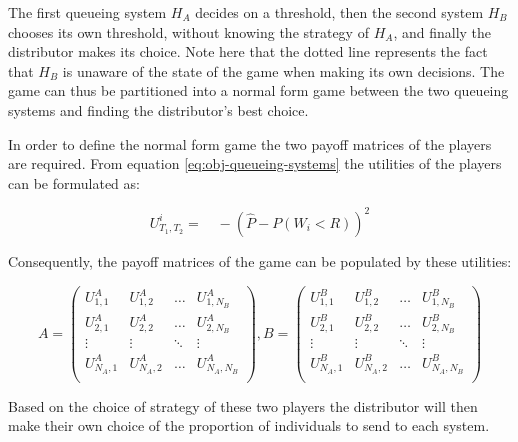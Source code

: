 The first 
queueing system \(H_A\) decides on a threshold, then the second system \(H_B\)
chooses its own threshold, without knowing the strategy of \(H_A\), and finally
the distributor makes its choice. Note here that the dotted line represents the
fact that \(H_B\) is unaware of the state of the game when making its own 
decisions. The game can thus be partitioned into a normal form game between the
two queueing systems and finding the distributor's best choice. 

In order to define the normal form game the two payoff matrices of the players 
are required. From equation \ref{eq:obj-queueing-systems} the utilities of the
players can be formulated as:

\begin{equation}
    U_{T_1, T_2}^i = \quad -\left( 
        \hat{P} - P(W_i < R) 
    \right)^2
\end{equation}

Consequently, the payoff matrices of the game can be populated by these 
utilities:

\begin{equation} \label{eq:payoff-matrices}
    A = 
    \begin{pmatrix}
        U_{1,1}^A & U_{1,2}^A & \dots & U_{1,N_B}^A \\
        U_{2,1}^A & U_{2,2}^A & \dots & U_{2,N_B}^A \\
        \vdots & \vdots & \ddots & \vdots \\
        U_{N_A,1}^A & U_{N_A,2}^A & \dots & U_{N_A,N_B}^A \\
    \end{pmatrix},
    B = 
    \begin{pmatrix}
        U_{1,1}^B & U_{1,2}^B & \dots & U_{1,N_B}^B \\
        U_{2,1}^B & U_{2,2}^B & \dots & U_{2,N_B}^B \\
        \vdots & \vdots & \ddots & \vdots \\
        U_{N_A,1}^B & U_{N_A,2}^B & \dots & U_{N_A,N_B}^B \\
    \end{pmatrix}
\end{equation}

Based on the choice of strategy of these two players the distributor will then 
make their own choice of the proportion of individuals to send to each system.
